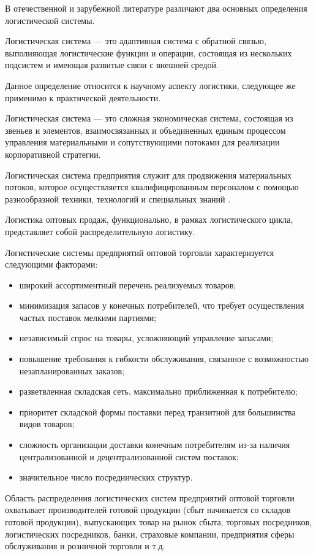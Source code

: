 В отечественной и зарубежной литературе различают два основных определения логистической системы.

Логистическая система --- это адаптивная система с обратной связью, выполняющая логистические функции и операции, состоящая из нескольких подсистем и имеющая развитые связи с внешней средой.

Данное определение относится к научному аспекту логистики, следующее же применимо к практической деятельности.

Логистическая система --- это сложная экономическая система, состоящая из звеньев и элементов, взаимосвязанных и объединенных единым процессом управления материальными и сопутствующими потоками для реализации корпоративной стратегии.

Логистическая система предприятия служит для продвижения материальных потоков, которое осуществляется квалифицированным персоналом с помощью разнообразной техники, технологий и специальных знаний \cite[с.116]{levkin}.



Логистика оптовых продаж, функционально, в рамках логистического цикла, представляет собой распределительную логистику.

Логистические системы предприятий оптовой торговли характеризуется следующими факторами:
\begin{itemize}
	\item широкий ассортиментный перечень реализуемых товаров;
	\item минимизация запасов у конечных потребителей, что требует осуществления частых поставок мелкими партиями;
	\item независимый спрос на товары, усложняющий управление запасами;
	\item повышение требования к гибкости обслуживания, связанное с возможностью незапланированных заказов;
	\item разветвленная складская сеть, максимально приближенная к потребителю;
	\item приоритет складской формы поставки перед транзитной для большинства видов товаров;
	\item сложность организации доставки конечным потребителям из-за наличия централизованной и децентрализованной систем поставок;
	\item значительное число посреднических структур.
\end{itemize}

Область распределения логистических систем предприятий оптовой торговли охватывает производителей  готовой продукции (сбыт начинается со складов готовой продукции), выпускающих товар на рынок сбыта, торговых посредников, логистических посредников, банки, страховые компании, предприятия сферы обслуживания и розничной торговли и т.д. 

